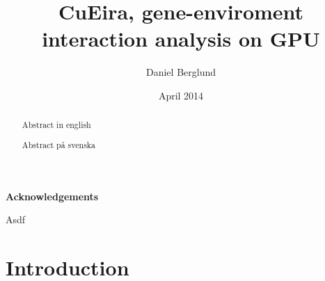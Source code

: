 \documentclass[10pt,a4paper]{report}
\title{CuEira, gene-enviroment interaction analysis on GPU}
\author{Daniel Berglund}
\date{April 2014}
\makeatletter
\newcommand\ackname{Acknowledgements}
\newenvironment{acknowledgements}{
      \titlepage
      \null\vfil
      \@beginparpenalty\@lowpenalty
      \begin{center}%
        \bfseries \ackname
        \@endparpenalty\@M
      \end{center}}%
     {\par\vfil\null\endtitlepage}
\newenvironment{acknowledgements}{
      \if@twocolumn
        \section*{\abstractname}
      \else
        \small
        \begin{center}
          {\bfseries \ackname\vspace{-.5em}\vspace{\z@}}
        \end{center}
        \quotation
      \fi}
      {\if@twocolumn\else\endquotation\fi}
\makeatother
\begin{document}
\maketitle
\thispagestyle{empty}

\clearpage
\thispagestyle{empty}
\begin{abstract}
Abstract in english
\end{abstract}

\clearpage
\thispagestyle{empty}
\begin{abstract}
Abstract på svenska
\end{abstract}

\clearpage
\thispagestyle{empty}
\begin{acknowledgements}
Asdf
\end{acknowledgements}

\clearpage
\tableofcontents
\thispagestyle{empty}

\clearpage
\setcounter{page}{1}
\chapter{Introduction}


\end{document}
